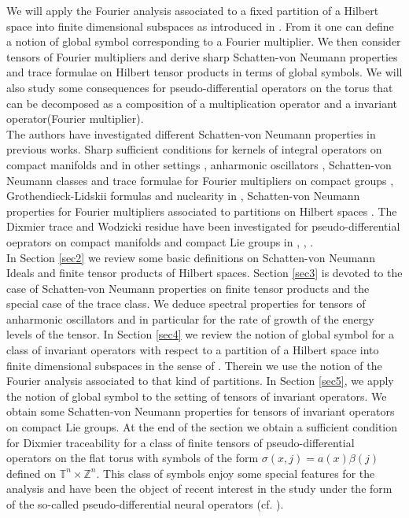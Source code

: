 \documentclass[a4paper,12pt,reqno]{amsart}
\theoremstyle{definition}
\theoremstyle{remark}
\numberwithin{equation}{section}
\def\Tn{{{\mathbb T}^n}}
\def\Zn{{{\mathbb Z}^n}}
\begin{document}
 
 
 
 
We will apply the Fourier analysis associated to a fixed partition of a Hilbert space into finite dimensional subspaces as introduced in \cite{fjdmr:foum}. From it one can define a notion of global symbol corresponding to a Fourier multiplier. We then consider tensors of Fourier multipliers and derive sharp Schatten-von Neumann properties and trace formulae  on Hilbert tensor products in terms of global symbols. We will also study some consequences for pseudo-differential operators on the torus that can be decomposed as a composition of a multiplication operator and a invariant operator(Fourier multiplier).\\
   

The authors have investigated different Schatten-von Neumann properties in previous works. Sharp sufficient conditions for kernels of integral operators on compact manifolds \cite{dr:suffkernel} and in other settings \cite {dr:intsc}, anharmonic oscillators \cite{anh:cdr},  Schatten-von Neumann classes and trace formulae for Fourier multipliers  on compact groups  \cite{dr13:schatten}, Grothendieck-Lidskii formulas and nuclearity in \cite{dr13a:nuclp}, Schatten-von Neumann properties for Fourier multipliers associated to partitions on Hilbert spaces \cite{fjdmr:foum}. The Dixmier trace and Wodzicki residue have been investigated for pseudo-differential oeprators on compact manifolds and compact Lie groups in \cite{cdc20}, \cite{ckc20}, \cite{cc20}.\\

In Section \ref{sec2} we review some basic definitions on Schatten-von Neumann Ideals and finite tensor products of Hilbert spaces. Section \ref{sec3} is devoted to the case of Schatten-von Neumann properties on finite  tensor products and the special case of the trace class. We deduce spectral properties for tensors of anharmonic oscillators and in particular for the rate of growth of the energy levels of the tensor.  In Section  \ref{sec4} we review the notion of global symbol for  a class of invariant operators with respect to a partition of a Hilbert space into finite dimensional subspaces in the sense of \cite{fjdmr:foum}. Therein we use the notion of the Fourier analysis associated to that kind  of partitions. In Section \ref{sec5}, we apply the notion of global symbol to the setting of  tensors of invariant operators.  We obtain some Schatten-von Neumann properties for tensors of invariant operators on compact Lie groups. At the end of the section we obtain a sufficient condition for Dixmier traceability for a class of finite tensors of pseudo-differential operators on the flat torus with symbols of the form $\sigma(x,j)=a(x)\beta(j)$ defined on $\Tn\times \Zn$. This class of symbols enjoy some special features for the analysis and have been the object of recent interest in the study under the form of the so-called  pseudo-differential neural operators  (cf. \cite{pnetw:ko}).  
\end{document}
